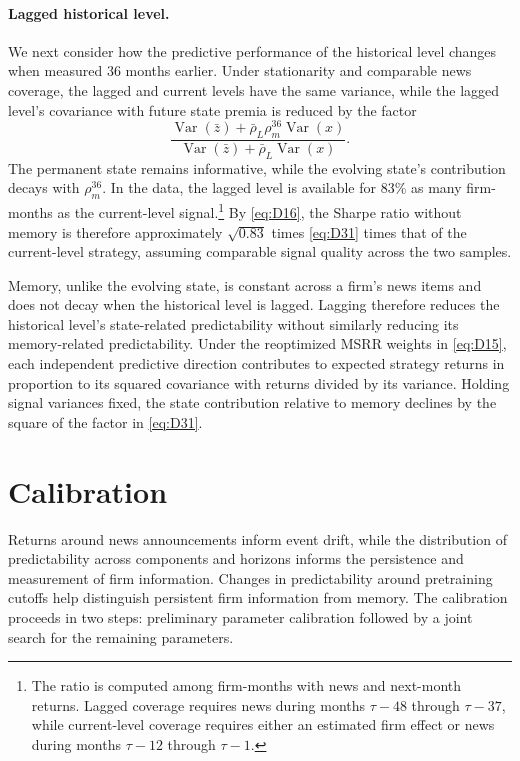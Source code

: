 \documentclass[11pt,letterpaper]{article}
\theoremstyle{remark}
\DeclareMathOperator{\Var}{Var}
\begin{document}
\paragraph{Lagged historical level.}
We next consider how the predictive performance of the historical level changes when measured 36 months earlier. Under stationarity and comparable news coverage, the lagged and current levels have the same variance, while the lagged level's covariance with future state premia is reduced by the factor
\begin{equation}\label{eq:D31}
\frac{\Var(\bar z)+\bar\rho_L\rho_m^{36}\Var(x)}
{\Var(\bar z)+\bar\rho_L\Var(x)}.
\end{equation}
The permanent state remains informative, while the evolving state's contribution decays with $\rho_m^{36}$. In the data, the lagged level is available for 83\% as many firm-months as the current-level signal.\footnote{The ratio is computed among firm-months with news and next-month returns. Lagged coverage requires news during months $\tau-48$ through $\tau-37$, while current-level coverage requires either an estimated firm effect or news during months $\tau-12$ through $\tau-1$.}
By \eqref{eq:D16}, the Sharpe ratio without memory is therefore approximately $\sqrt{0.83}$ times \eqref{eq:D31} times that of the current-level strategy, assuming comparable signal quality across the two samples.

Memory, unlike the evolving state, is constant across a firm's news items and does not decay when the historical level is lagged. Lagging therefore reduces the historical level's state-related predictability without similarly reducing its memory-related predictability. Under the reoptimized MSRR weights in \eqref{eq:D15}, each independent predictive direction contributes to expected strategy returns in proportion to its squared covariance with returns divided by its variance. Holding signal variances fixed, the state contribution relative to memory declines by the square of the factor in \eqref{eq:D31}.

\section{Calibration}\label{sec:calibration}

Returns around news announcements inform event drift, while the distribution of predictability across components and horizons informs the persistence and measurement of firm information. Changes in predictability around pretraining cutoffs help distinguish persistent firm information from memory. The calibration proceeds in two steps: preliminary parameter calibration followed by a joint search for the remaining parameters.
\end{document}
